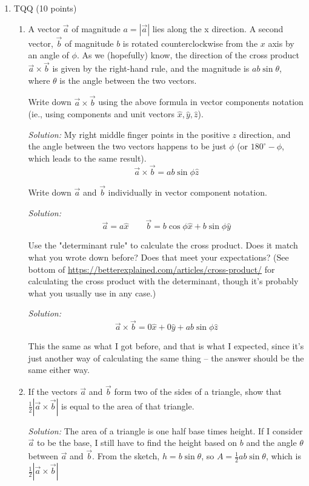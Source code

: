 \documentclass[12pt]{article}
\newcommand{\soln}[1] {\textit{Solution:} #1}
\begin{document}
\begin{enumerate}
    \item TQQ (10 points)

          \begin{enumerate}
              \item
                    A vector $\vec a$ of magnitude $a = |\vec a|$ lies along the x direction. A second vector, $\vec b$ of magnitude $b$ is rotated counterclockwise from the $x$ axis by an angle of $\phi$. As we (hopefully) know, the direction of the cross product $\vec a \times \vec b$ is given by the right-hand rule, and the magnitude is $ab\sin \theta$, where $\theta$ is the angle between the two vectors.

                    Write down $\vec a \times \vec b$ using the above formula in vector components notation (ie., using components and unit vectors $\hat x, \hat y, \hat z$).

                    \soln{
                        My right middle finger points in the positive $z$ direction, and the angle between the two vectors happens to be just $\phi$ (or $180^\circ - \phi$, which leads to the same result).
                        $$\vec a \times \vec b = a b \sin\phi \hat z$$
                    }

                    Write down $\vec a$ and $\vec b$ individually in vector component notation.

                    \soln{$$\vec a = a \hat x\qquad \vec b = b \cos\phi \hat x + b \sin\phi \hat y$$}

                    Use the "determinant rule" to calculate the cross product. Does it match what you wrote down before? Does that meet your expectations? (See bottom of \url{https://betterexplained.com/articles/cross-product/} for calculating the cross product with the determinant, though it's probably what you usually use in any case.)

                    \soln{$$\vec a \times \vec b = 0\hat x + 0\hat y + ab\sin\phi\hat z$$

                        This the same as what I got before, and that is what I expected, since it's just another way of calculating the same thing -- the answer should be the same either way.
                    }
              \item
                    If the vectors $\vec a$ and $\vec b$ form two of the sides of a triangle, show that $\frac{1}{2}|\vec a \times \vec b|$ is equal to the area of that triangle.

                    \soln{The area of a triangle is one half base times height. If I consider $\vec a$ to be the base, I still have to find the height based on $b$ and the angle $\theta$ between $\vec a$ and $\vec b$. From the sketch, $h = b\sin\theta$, so $A = \frac{1}{2}ab\sin\theta$, which is $\frac{1}{2}|\vec a \times \vec b|$

}
\end{enumerate}
\end{enumerate}
\end{document}
